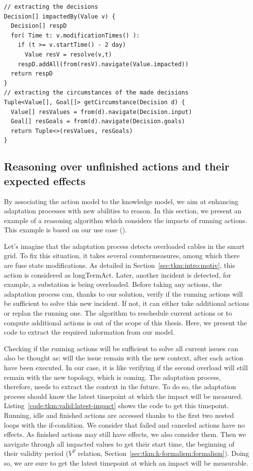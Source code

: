 \begin{lstlisting}[style=customc,caption=Get the goals used by the adaptation process from executed actions, label=code:actions-to-goals,basicstyle=\scriptsize]
// extracting the decisions
Decision[] impactedBy(Value v) {
  Decision[] respD
  for( Time t: v.modificationTimes() ):
    if (t >= v.startTime() - 2 day)
      Value resV = resolve(v,t)
    respD.addAll(from(resV).navigate(Value.impacted))
  return respD
}
// extracting the circumstances of the made decisions
Tuple<Value[], Goal[]> getCircumstance(Decision d) {
  Value[] resValues = from(d).navigate(Decision.input)
  Goal[] resGoals = from(d).navigate(Decision.goals)      
  return Tuple<>(resValues, resGoals)
} 
\end{lstlisting}

\subsection{Reasoning over unfinished actions and their expected effects}
By associating the action model to the knowledge model, we aim at enhancing adaptation processes with new abilities to reason.
In this section, we present an example of a reasoning algorithm which considers the impacts of running actions.
This example is based on our use case (\cf {}).

Let's imagine that the adaptation process detects overloaded cables in the smart grid.
To fix this situation, it takes several countermeasures, among which there are fuse state modifications.
As detailed in Section~\ref{sec:tkm:intro:motiv}, this action is considered as \gls{longTermAct}.
Later, another incident is detected, for example, a substation is being overloaded.
Before taking any actions, the adaptation process can, thanks to our solution, verify if the running actions will be sufficient to solve this new incident.
If not, it can either take additional actions or replan the running one.
The algorithm to reschedule current actions or to compute additional actions is out of the scope of this thesis.
Here, we present the code to extract the required information from our model.

Checking if the running actions will be sufficient to solve all current issues can also be thought as: will the issue remain with the new context, \ie after each action have been executed.
In our case, it is like verifying if the second overload will still remain with the new topology, which is coming.
The adaptation process, therefore, needs to extract the context in the future.
To do so, the adaptation process should know the latest timepoint at which the impact will be measured.
Listing~\ref{code:tkm:valid:latest-impact} shows the code to get this timepoint.
Running, idle and finished actions are accessed thanks to the first two nested loops with the if-condition.
We consider that failed and canceled actions have no effects.
As finished actions may still have effects, we also consider them.
Then we navigate through all impacted values to get their start time, \ie the beginning of their validity period ($V^T$ relation, \cf Section~\ref{sec:tkm:k-formalism:formalism}).
Doing so, we are sure to get the latest timepoint at which an impact will be measurable.

